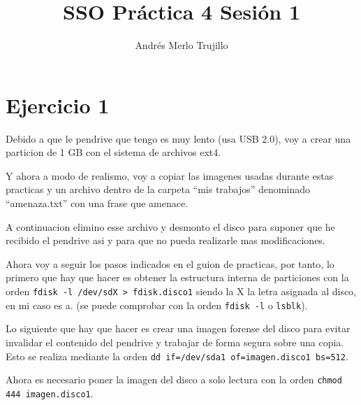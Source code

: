 \documentclass{article}
\title{SSO Práctica 4 Sesión 1}
\author{Andrés Merlo Trujillo}
\date{}
\begin{document}
\maketitle

\tableofcontents

\newpage

\section*{Ejercicio 1}

Debido a que le pendrive que tengo es muy lento (usa USB 2.0), voy a crear una particion de 1 GB con el sistema de archivos ext4.

Y ahora a modo de realismo, voy a copiar las imagenes usadas durante estas practicas y un archivo dentro de la carpeta ``mis trabajos'' denominado ``amenaza.txt'' con una frase que amenace.


A continuacion elimino esse archivo y desmonto el disco para suponer que he recibido el pendrive asi y para que no pueda realizarle mas modificaciones.

Ahora voy a seguir los pasos indicados en el guion de practicas, por tanto, lo primero que hay que hacer es obtener la estructura interna de particiones con la orden \verb|fdisk -l /dev/sdX > fdisk.disco1| siendo la X la letra asignada al disco, en mi caso es a. (se puede comprobar con la orden \verb|fdisk -l| o \verb|lsblk|).


Lo siguiente que hay que hacer es crear una imagen forense del disco para evitar invalidar el contenido del pendrive y trabajar de forma segura sobre una copia. Esto se realiza mediante la orden \verb|dd if=/dev/sda1 of=imagen.disco1 bs=512|.


Ahora es necesario poner la imagen del disco a solo lectura con la orden \verb|chmod 444 imagen.disco1|.
\end{document}
